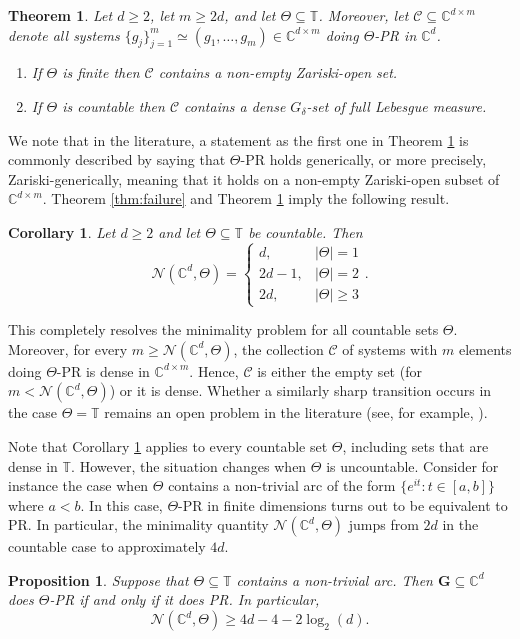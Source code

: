 \documentclass[reqno,a4paper,11pt]{amsart}
\numberwithin{equation}{section}
\newtheorem{theorem}[definition]{Theorem}
\newtheorem{corollary}[definition]{Corollary}
\newtheorem{proposition}[definition]{Proposition}
\def\T{{\mathbb T}}
\def\C{{\mathbb C}}
\newcommand\1{\mathds{1}}
\begin{document}
\begin{theorem}\label{thm:generic_2d}
    Let $d\geq 2$, let $m \geq 2d$, and let $\Theta\subseteq \T$. Moreover, let $\mathcal{C} \subseteq \C^{d \times m}$ denote all systems $\{ g_j \}_{j=1}^m \simeq (g_1, \dots, g_m) \in \C^{d \times m}$ doing $\Theta$-PR in $\C^d$.
    \begin{enumerate}
        \item If $\Theta$ is finite then $\mathcal{C}$ contains a non-empty Zariski-open set.
        \item If $\Theta$ is countable then $\mathcal{C}$ contains a dense $G_\delta$-set of full Lebesgue measure.
    \end{enumerate}
\end{theorem}

We note that in the literature, a statement as the first one in Theorem \ref{thm:generic_2d} is commonly described by saying that $\Theta$-PR holds generically, or more precisely, Zariski-generically, meaning that it holds on a non-empty Zariski-open subset of $\C^{d \times m}$. Theorem \ref{thm:failure} and Theorem \ref{thm:generic_2d} imply the following result.

\begin{corollary}\label{cor:minimality_theta_pr}
    Let $d\geq 2$ and let $\Theta\subseteq \T$ be countable. Then
    $$
    \mathcal{N}(\C^d,\Theta) = \begin{cases}
        d, & |\Theta| = 1 \\
        2d-1, & |\Theta| = 2 \\
        2d, & |\Theta| \geq 3
    \end{cases}.
$$
\end{corollary}
This completely resolves the minimality problem for all countable sets $\Theta$. Moreover, for every $m \geq \mathcal{N}(\C^d,\Theta)$, the collection $\mathcal{C}$ of systems with $m$ elements doing $\Theta$-PR is dense in $\C^{d \times m}$. Hence, $\mathcal{C}$ is either the empty set (for $m < \mathcal{N}(\C^d,\Theta)$) or it is dense. Whether a similarly sharp transition occurs in the case $\Theta = \T$ remains an open problem in the literature (see, for example, \cite[Section 2]{cahill2016phase}).

Note that Corollary \ref{cor:minimality_theta_pr} applies to every countable set $\Theta$, including sets that are dense in $\T$. However, the situation changes when $\Theta$ is uncountable. Consider for instance the case when $\Theta$ contains a non-trivial arc of the form $\{ e^{it} : t \in [a,b] \}$ where $a<b$. In this case, $\Theta$-PR in finite dimensions turns out to be equivalent to PR. In particular, the minimality quantity $\mathcal{N}(\C^d,\Theta)$ jumps from $2d$ in the countable case to approximately $4d$.
\begin{proposition}\label{prop:arc}
Suppose that $\Theta \subseteq \T$ contains a non-trivial arc. Then $\mathbf{G}\subseteq \C^d$ does $\Theta$-PR if and only if it does PR. In particular,
$$
\mathcal{N}(\C^d,\Theta) \geq 4d -4 - 2\log_2(d).
$$
\end{proposition}
\end{document}

